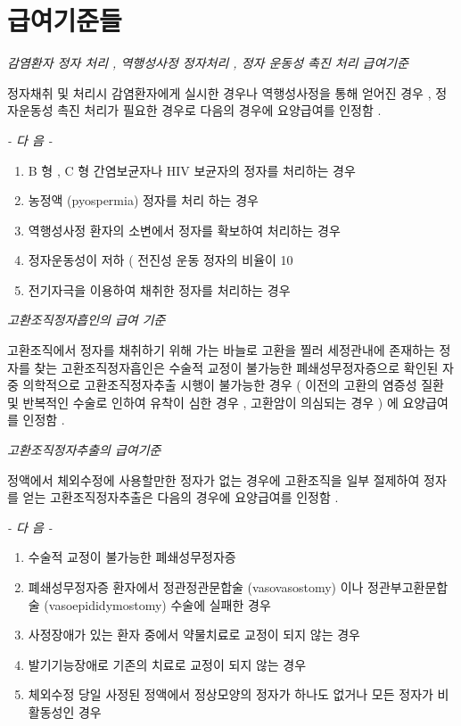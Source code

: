\section{급여기준들}
\par 
\emph{감염환자 정자 처리 ,  역행성사정  정자처리 ,  정자 운동성 촉진 처리  급여기준} \par
정자채취 및 처리시 감염환자에게 실시한 경우나 역행성사정을 통해 얻어진 경우 ,  정자운동성 촉진 처리가 필요한 경우로 다음의 경우에 요양급여를 인정함 . \par
\emph{-  다 음  -}\par  
\begin{enumerate}[가.]\tightlist
\item B 형 , C 형 간염보균자나  HIV  보균자의 정자를 처리하는 경우 
\item 농정액 (pyospermia)  정자를 처리 하는 경우 
\item 역행성사정 환자의 소변에서 정자를 확보하여 처리하는 경우 
\item 정자운동성이 저하 ( 전진성 운동 정자의 비율이  10%
\item 전기자극을 이용하여 채취한 정자를 처리하는 경우 
\end{enumerate}

\emph{고환조직정자흡인의 급여 기준}\par 
고환조직에서 정자를 채취하기 위해 가는 바늘로 고환을 찔러  세정관내에 존재하는 정자를 찾는 고환조직정자흡인은 수술적  교정이 불가능한 폐쇄성무정자증으로 확인된 자 중 의학적으로  고환조직정자추출 시행이 불가능한 경우 ( 이전의  고환의 염증성  질환 및 반복적인 수술로 인하여 유착이 심한 경우 ,  고환암이 의심되는 경우 ) 에 요양급여를 인정함 . \par
 

\emph{고환조직정자추출의 급여기준}\par 
정액에서 체외수정에 사용할만한 정자가 없는 경우에 고환조직을  일부 절제하여 정자를 얻는 고환조직정자추출은 다음의 경우에 요양급여를 인정함 . \par

\emph{-  다 음  -}\par 
\begin{enumerate}[가.]\tightlist
\item 수술적 교정이 불가능한 폐쇄성무정자증 
\item 폐쇄성무정자증 환자에서 정관정관문합술 (vasovasostomy) 이나 정관부고환문합술 (vasoepididymostomy)  수술에 실패한  경우 
\item 사정장애가 있는 환자 중에서 약물치료로 교정이 되지 않는  경우 
\item 발기기능장애로 기존의 치료로 교정이 되지 않는 경우 
\item 체외수정 당일 사정된 정액에서 정상모양의 정자가 하나도  없거나 모든 정자가  비활동성인  경우 
\end{enumerate} 

